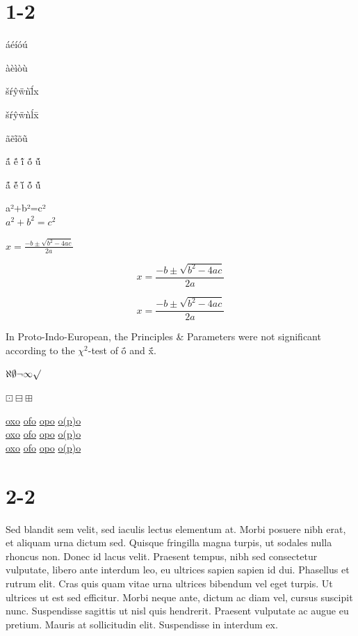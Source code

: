 \documentclass{scrartcl}
\begin{document}
\section{1-2}
áéíóú

àèìòù

šŕŷẅǹĺ̄x

\v s\'r\^y\"w\`n\'l\=x 

ãẽĩõũ

{\'{\~{a}}}
{\'{\~{e}}}
{\'{\~{i}}}
{\'{\~{o}}}
{\'{\~{u}}}

{\~{\'{a}}}
{\~{\'{e}}}
{\~{\'{i}}}
{\~{\'{o}}}
{\~{\'{u}}}

\noindent
a²+b²=c²\\
$a^2+b^2=c^2$

$x = \frac{-b \pm \sqrt{b^2-4ac}}{2a} $

$$x = \frac{-b \pm \sqrt{b^2-4ac}}{2a} $$

\[x = \frac{-b \pm \sqrt{b^2-4ac}}{2a}\]

\newcommand{\PIE}{Proto-Indo-European}
\newcommand{\PP}{Principles \& Parameters}
\newcommand{\chisquare}{$\chi^2$}
\newcommand{\macronacuteo}{\'{\={o}}}
\newcommand{\macronacute}[1]{\'{\={#1}}}

In {\PIE}, the {\PP} were not significant according to the {\chisquare}-test of \macronacuteo{} and \macronacute{x}.

$\aleph \emptyset \neg \infty \surd$

\textinterrobang \textreferencemark \texttildelow $\boxdot\boxminus\boxplus$

\noindent
 \underline{oxo} \underline{ofo} \underline{opo} \underline{o(p)o}\\
 \uline{oxo} \uline{ofo} \uline{opo} \uline{o(p)o}\\
 \ul{oxo} \ul{ofo} \ul{opo} \ul{o(p)o}\\
 
\section{2-2} 
Sed blandit sem velit, sed iaculis lectus elementum at. Morbi posuere nibh erat, et aliquam urna dictum sed. Quisque fringilla magna turpis, ut sodales nulla rhoncus non. Donec id lacus velit. Praesent tempus, nibh sed consectetur vulputate, libero ante interdum leo, eu ultrices sapien sapien id dui. Phasellus et rutrum elit. Cras quis quam vitae urna ultrices bibendum vel eget turpis. Ut ultrices ut est sed efficitur. Morbi neque ante, dictum ac diam vel, cursus suscipit nunc. Suspendisse sagittis ut nisl quis hendrerit. Praesent vulputate ac augue eu pretium. Mauris at sollicitudin elit. Suspendisse in interdum ex.
\end{document}
